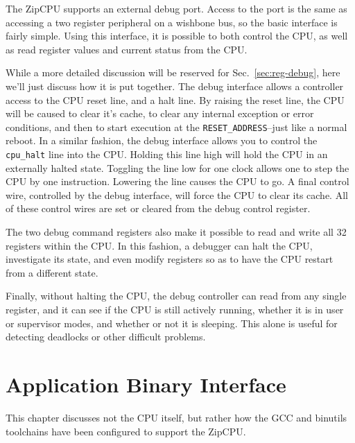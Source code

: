 \documentclass{gqtekspec}
\begin{document}
The ZipCPU supports an external debug port.  Access to the port is the
same as accessing a two register peripheral on a wishbone bus, so the basic
interface is fairly simple.  Using this interface, it is possible to both
control the CPU, as well as read register values and current status from the
CPU.

While a more detailed discussion will be reserved for Sec.~\ref{sec:reg-debug},
here we'll just discuss how it is put together.  The debug interface allows
a controller access to the CPU reset line, and a halt line.  By raising the
reset line, the CPU will be caused to clear it's cache, to clear any internal
exception or error conditions, and then to start execution at the
{\tt RESET\_ADDRESS}--just like a normal reboot.  In a similar fashion, the
debug interface allows you to control the {\tt cpu\_halt} line into the
CPU.  Holding this line high will hold the CPU in an externally halted state.
Toggling the line low for one clock allows one to step the CPU by one 
instruction.  Lowering the line causes the CPU to go.  A final control wire, 
controlled by the debug interface, will force the CPU to clear its cache.
All of these control wires are set or cleared from the debug control register.

The two debug command registers also make it possible to read and write
all 32 registers within the CPU.  In this fashion, a debugger can halt the
CPU, investigate its state, and even modify registers so as to have the
CPU restart from a different state.

Finally, without halting the CPU, the debug controller can read from any
single register, and it can see if the CPU is still actively running, whether
it is in user or supervisor modes, and whether or not it is sleeping.  This
alone is useful for detecting deadlocks or other difficult problems.

\chapter{Application Binary Interface}\label{chap:abi}

This chapter discusses not the CPU itself, but rather how the GCC and binutils
toolchains have been configured to support the ZipCPU.

\end{document}
